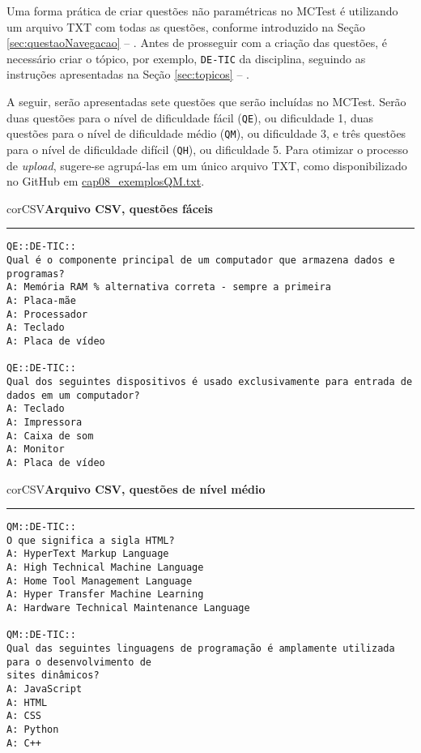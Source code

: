 Uma forma prática de criar questões não paramétricas no MCTest é utilizando um arquivo TXT com todas as questões, conforme introduzido na Seção \ref{sec:questaoNavegacao} -- . Antes de prosseguir com a criação das questões, é necessário criar o tópico, por exemplo, \verb|DE-TIC| da disciplina, seguindo as instruções apresentadas na Seção \ref{sec:topicos} -- . 

A seguir, serão apresentadas sete questões que serão incluídas no MCTest. Serão duas questões para o nível de dificuldade fácil (\verb|QE|), ou dificuldade 1, duas questões para o nível de dificuldade médio (\verb|QM|), ou dificuldade 3, e três questões para o nível de dificuldade difícil (\verb|QH|), ou dificuldade 5. Para otimizar o processo de \textit{upload}, sugere-se agrupá-las em um único arquivo TXT, como disponibilizado no GitHub em \href{https://raw.githubusercontent.com/fzampirolli/mctest/master/book/2ed-br/cap08_exemplosQM.txt}{cap08\_exemplosQM.txt}.

\begin{myboxCode}{corCSV}{\textbf{Arquivo CSV, questões fáceis }}\vspace{3mm}
\hrule
{\footnotesize
\begin{verbatim}
QE::DE-TIC:: 
Qual é o componente principal de um computador que armazena dados e programas?
A: Memória RAM % alternativa correta - sempre a primeira
A: Placa-mãe
A: Processador
A: Teclado
A: Placa de vídeo

QE::DE-TIC:: 
Qual dos seguintes dispositivos é usado exclusivamente para entrada de dados em um computador?
A: Teclado 
A: Impressora
A: Caixa de som
A: Monitor
A: Placa de vídeo
\end{verbatim}
}
\end{myboxCode}

\begin{myboxCode}{corCSV}{\textbf{Arquivo CSV, questões de nível médio }}\vspace{3mm}
\hrule
{\footnotesize
\begin{verbatim}
QM::DE-TIC:: 
O que significa a sigla HTML?
A: HyperText Markup Language
A: High Technical Machine Language
A: Home Tool Management Language
A: Hyper Transfer Machine Learning
A: Hardware Technical Maintenance Language

QM::DE-TIC:: 
Qual das seguintes linguagens de programação é amplamente utilizada para o desenvolvimento de 
sites dinâmicos?
A: JavaScript
A: HTML
A: CSS
A: Python
A: C++
\end{verbatim}
}
\end{myboxCode}

